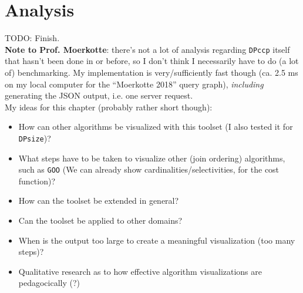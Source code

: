 \section{Analysis}

TODO: Finish.\\

\textbf{Note to Prof. Moerkotte}: there's not a lot of analysis regarding \texttt{DPccp} itself that hasn't been done in \cite{moerkotte2009building} or \cite{moerkotte2006analysis} before, so I don't think I necessarily have to do (a lot of) benchmarking. My implementation is very/sufficiently fast though (ca. 2.5 ms on my local computer for the ``Moerkotte 2018'' query graph), \textit{including} generating the JSON output, i.e. one server request.\\

My ideas for this chapter (probably rather short though):
\begin{itemize}
    \item How can other algorithms be visualized with this toolset (I also tested it for \texttt{DPsize})? 
    \item What steps have to be taken to visualize other (join ordering) algorithms, such as \texttt{GOO} (We can already show cardinalities/selectivities, for the cost function)? 
    \item How can the toolset be extended in general?
    \item Can the toolset be applied to other domains?
    \item When is the output too large to create a meaningful visualization (too many steps)?
    \item Qualitative research as to how effective algorithm visualizations are pedagocically (?)
\end{itemize}

